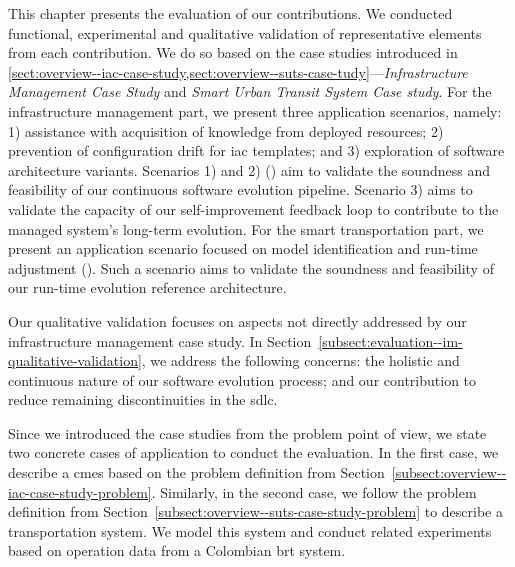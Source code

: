 \label{chapter:evaluation}

\minitoc



This chapter presents the evaluation of our contributions. We conducted functional, experimental and qualitative validation of representative elements from each contribution. We do so based on the case studies introduced in  \cref{sect:overview--iac-case-study,sect:overview--suts-case-tudy}---\emph{Infrastructure Management Case Study} and \emph{Smart Urban Transit System Case study}. For the infrastructure management part, we present three application scenarios, namely: 1) assistance with acquisition of knowledge from deployed resources; 2) prevention of configuration drift for \gls{iac} templates; and 3) exploration of software architecture variants. Scenarios 1) and 2) () aim to validate the soundness and feasibility of our continuous software evolution pipeline. Scenario 3) aims to validate the capacity of our self-improvement feedback loop to contribute to the managed system's long-term evolution. For the smart transportation part, we present an application scenario focused on model identification and run-time adjustment (). Such a scenario aims to validate the soundness and feasibility of our run-time evolution reference architecture.

Our qualitative validation focuses on aspects not directly addressed by our infrastructure management case study. In Section~\ref{subsect:evaluation--im-qualitative-validation}, we address the following concerns: the holistic and continuous nature of our software evolution process; and our contribution to reduce remaining discontinuities in the \gls{sdlc}.

Since we introduced the case studies from the problem point of view, we state two concrete cases of application to conduct the evaluation. In the first case, we describe a \gls{cmes} based on the problem definition from Section~\ref{subsect:overview--iac-case-study-problem}. Similarly, in the second case, we follow the problem definition from Section~\ref{subsect:overview--suts-case-study-problem} to describe a transportation system. We model this system and conduct related experiments based on operation data from a Colombian \gls{brt} system.

